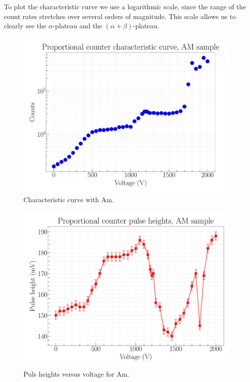 To plot the characteristic curve we use a logarithmic scale, since the range of the count rates stretches over several orders of magnitude. This scale allows us to clearly see the $\alpha$-plateau and the $(\alpha+\beta)$-plateau. 

\begin{figure}[H]
\centering
\includegraphics[width=\textwidth]{../Figures/Proportional_characteristic_curve_AM.pdf}
\caption{Characteristic curve with Am.}
\label{fig:AmChar}
\end{figure}

\begin{figure}[H]
\centering
\includegraphics[width=\textwidth]{../Figures/Proportional_pulse_heights_AM.pdf}
\caption{Puls heights versus voltage for Am.}
\label{fig:AmPH}
\end{figure}

